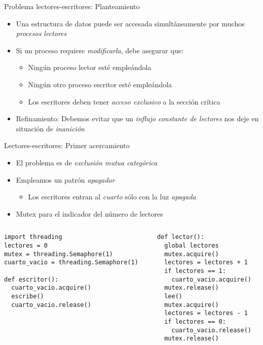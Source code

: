 \documentclass[presentation]{beamer}
\begin{document}
\begin{frame}[label={sec:org85ad73a}]{Problema lectores-escritores: Planteamiento}
\begin{itemize}
\item Una estructura de datos puede ser accesada simultáneamente por
muchos \emph{procesos lectores}
\item Si un proceso requiere \emph{modificarla}, debe asegurar que:
\begin{itemize}
\item Ningún proceso lector esté empleándola
\item Ningún otro proceso escritor esté empleándola
\item Los escritores deben tener \emph{acceso exclusivo} a la sección
crítica
\end{itemize}
\item Refinamiento: Debemos evitar que un \emph{influjo constante de lectores}
nos deje en situación de \emph{inanición}
\end{itemize}
\end{frame}

\begin{frame}[label={sec:org9811f10},fragile]{Lectores-escritores: Primer acercamiento}
 \begin{itemize}
\item El problema es de \emph{exclusión mutua categórica}
\item Empleamos un patrón \emph{apagador}
\begin{itemize}
\item Los escritores entran al \emph{cuarto} sólo con la luz \emph{apagada}
\end{itemize}
\item Mutex para el indicador del número de lectores
\end{itemize}
\begin{columns}\begin{column}{0.5\textwidth}
\begin{verbatim}
import threading
lectores = 0
mutex = threading.Semaphore(1)
cuarto_vacio = threading.Semaphore(1)

def escritor():
  cuarto_vacio.acquire()
  escribe()
  cuarto_vacio.release()
\end{verbatim}
\end{column} \begin{column}{0.5\textwidth}
\begin{verbatim}
def lector():
  global lectores
  mutex.acquire()
  lectores = lectores + 1
  if lectores == 1:
    cuarto_vacio.acquire()
  mutex.release()
  lee()
  mutex.acquire()
  lectores = lectores - 1
  if lectores == 0:
    cuarto_vacio.release()
  mutex.release()

\end{verbatim}
\end{column}\end{columns}
\end{frame}
\end{document}
